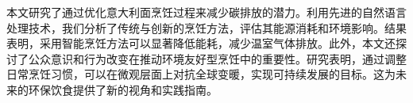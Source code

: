 本文研究了通过优化意大利面烹饪过程来减少碳排放的潜力。利用先进的自然语言处理技术，我们分析了传统与创新的烹饪方法，评估其能源消耗和环境影响。结果表明，采用智能烹饪方法可以显著降低能耗，减少温室气体排放。此外，本文还探讨了公众意识和行为改变在推动环境友好型烹饪中的重要性。研究表明，通过调整日常烹饪习惯，可以在微观层面上对抗全球变暖，实现可持续发展的目标。这为未来的环保饮食提供了新的视角和实践指南。